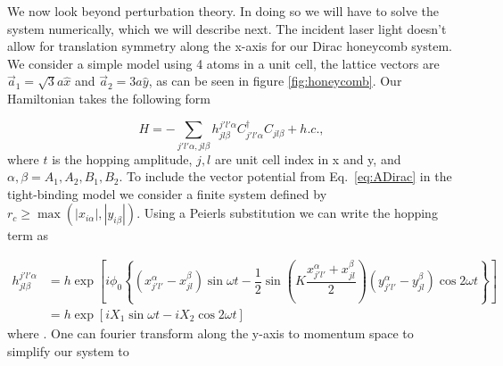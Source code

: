 We now look beyond perturbation theory.
In doing so we will have to solve the system numerically, which we will describe next.
The incident laser light doesn't allow for translation symmetry along the x-axis for our Dirac honeycomb system.
We consider a simple model using 4 atoms in a unit cell, the lattice vectors are $\vec{a}_1 = \sqrt{3}a\hat{x}$ and $\vec{a}_2 = 3a\hat{y}$, as can be seen in figure \ref{fig:honeycomb}.
Our Hamiltonian takes the following form

\begin{equation}
  H = -\sum_{j'l'\alpha,jl\beta} h^{j'l'\alpha}_{jl\beta} C^{\dagger}_{j'l'\alpha} C_{jl\beta} + h.c.,
\end{equation}
where $t$ is the hopping amplitude, $j,l$ are unit cell index in x and y, and $\alpha,\beta = A_1, A_2, B_1, B_2$.
To include the vector potential from Eq.~\eqref{eq:ADirac} in the tight-binding model we consider a finite system defined by $r_c \geq \max(|x_{i\alpha}|,|y_{i\beta}|)$.
Using a Peierls substitution we can write the hopping term as

\begin{align}
h^{j'l'\alpha}_{jl\beta} &= h \exp\left[ i \phi_0 \left\{ (x_{j'l'}^{\alpha} - x_{jl}^{\beta}) \sin{\omega t} - \dfrac{1}{2} \sin\left(K \dfrac{x_{j'l'}^{\alpha} + x_{jl}^{\beta}}{2} \right) (y_{j'l'}^{\alpha} - y_{jl}^{\beta}) \cos{2\omega t}  \right\} \right] \nonumber \\
  &= h \exp\left[ i X_1 \sin{\omega t} -i X_2 \cos{2\omega t}\right]
\end{align}
where $ $.
One can fourier transform along the y-axis to momentum space to simplify our system to

